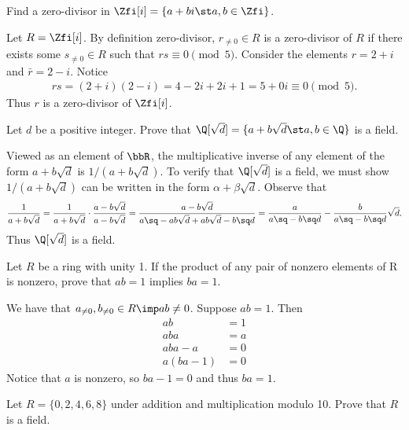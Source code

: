 \documentclass{article}
\begin{document}
Find a zero-divisor in \( \Zfi[i] = \{a+bi\st a,b\in\Zfi\} \).

\begin{solution} %
  Let \( R = \Zfi[i] \). By definition zero-divisor, \( r_{\neq 0}\in R \) is a zero-divisor of \( R \) if there exists some \( s_{\neq 0}\in R \) such that \( rs \equiv 0 \pmod 5 \). Consider the elements \( r = 2+i \) and \( \bar{r} = 2-i \). Notice \begin{align*}
    rs = (2+i)(2-i) = 4 -2i + 2i + 1 = 5 + 0i \equiv 0 \pmod 5.
  \end{align*}
  Thus \( r \) is a zero-divisor of \( \Zfi[i] \).
\end{solution}

Let \( d \) be a positive integer. Prove that \( \Q[\sqrt d] = \{a + b\sqrt d\st a,b\in\Q\}\) is a field.

\begin{solution} %
  Viewed as an element of \( \bbR \), the multiplicative inverse of any element of the form \( a+b\sqrt d \) is \( 1/(a+b\sqrt d) \). To verify that \( \Q[\sqrt d] \) is a field, we must show \( 1/(a+b\sqrt d) \) can be written in the form \( \alpha+\beta\sqrt d \). Observe that
  \begin{align*}
    \frac{1}{a+b\sqrt d} = \frac{1}{a+b\sqrt d} \cdot \frac{a-b\sqrt d}{a-b\sqrt d} = \frac{a-b\sqrt{d}}{a\sq -ab\sqrt{d} + ab \sqrt{d} - b\sq d} = \frac{a}{a\sq-b\sq d} - \frac{b}{a\sq-b\sq d}\sqrt{d}.
  \end{align*}
  Thus \( \Q[\sqrt{d}] \) is a field.
\end{solution}

Let \( R \) be a ring with unity 1. If the product of any pair of nonzero elements of R is nonzero, prove that \( ab=1 \) implies \( ba=1 \).

\begin{solution} %
  We have that \( a_{\neq 0}, b_{\neq 0}\in R \imp ab \neq 0 \). Suppose \( ab = 1 \). Then \begin{align*}
    ab &= 1 \\
    aba &= a \\
    aba - a &= 0 \\
    a(ba - 1) &= 0
  \end{align*}
    Notice that \( a \) is nonzero, so \( ba - 1 = 0 \) and thus \( ba = 1 \).
\end{solution}

Let \( R = \{0, 2, 4, 6, 8\} \) under addition and multiplication modulo 10. Prove that \( R \) is a field.
\end{document}
